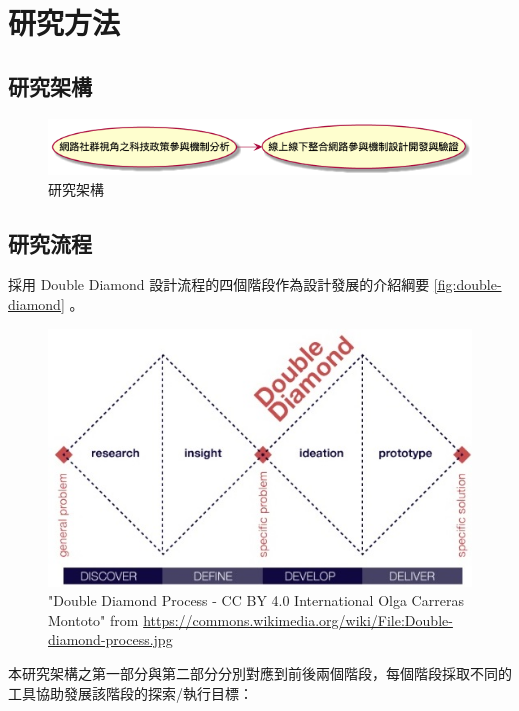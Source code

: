 \documentclass[12pt,a4paper]{article}
\begin{document}
\section{研究方法 }
\label{sec:orgf909871}
\subsection{研究架構}
\label{sec:org3fa8628}
\begin{figure}[htbp]
\centering
\includegraphics[width=.9\linewidth]{./images/research_arch.png}
\caption{\label{fig:orgfed04cc}
研究架構}
\end{figure}

\subsection{研究流程}
\label{sec:orge6b3b0e}
採用 Double Diamond \cite{double_diamond} 設計流程的四個階段作為設計發展的介紹綱要 \ref{fig:double-diamond} 。

\begin{figure}[htbp]
\centering
\includegraphics[width=.9\linewidth]{./images/Double-diamond-process.jpg}
\caption{\label{fig:org70edbd5}
"Double Diamond Process - CC BY 4.0 International Olga Carreras Montoto" from \url{https://commons.wikimedia.org/wiki/File:Double-diamond-process.jpg}}
\end{figure}

本研究架構之第一部分與第二部分分別對應到前後兩個階段，每個階段採取不同的工具協助發展該階段的探索/執行目標：
\end{document}
